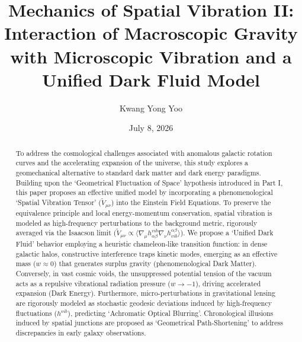 \documentclass[reprint,amsmath,amssymb,aps,prd]{revtex4-2}
\begin{document}

\title{Mechanics of Spatial Vibration II: Interaction of Macroscopic Gravity with Microscopic Vibration and a Unified Dark Fluid Model}

\author{Kwang Yong Yoo}
\date{July 8, 2026}

\begin{abstract}
To address the cosmological challenges associated with anomalous galactic rotation curves and the accelerating expansion of the universe, this study explores a geomechanical alternative to standard dark matter and dark energy paradigms.
Building upon the `Geometrical Fluctuation of Space' hypothesis introduced in Part I, this paper proposes an effective unified model by incorporating a phenomenological `Spatial Vibration Tensor' ($\tilde{V}_{\mu\nu}$) into the Einstein Field Equations.
To preserve the equivalence principle and local energy-momentum conservation, spatial vibration is modeled as high-frequency perturbations to the background metric, rigorously averaged via the Isaacson limit ($\tilde{V}_{\mu\nu} \propto \langle \nabla_\mu h_{\alpha\beta}^{vib} \nabla_\nu h^{\alpha\beta}_{vib} \rangle$).
We propose a `Unified Dark Fluid' behavior employing a heuristic chameleon-like transition function: in dense galactic halos, constructive interference traps kinetic modes, emerging as an effective mass ($w \approx 0$) that generates surplus gravity (phenomenological Dark Matter).
Conversely, in vast cosmic voids, the unsuppressed potential tension of the vacuum acts as a repulsive vibrational radiation pressure ($w \to -1$), driving accelerated expansion (Dark Energy).
Furthermore, micro-perturbations in gravitational lensing are rigorously modeled as stochastic geodesic deviations induced by high-frequency fluctuations ($h^{vib}$), predicting `Achromatic Optical Blurring'.
Chronological illusions induced by spatial junctions are proposed as `Geometrical Path-Shortening' to address discrepancies in early galaxy observations.
\end{abstract}

\maketitle
\end{document}
